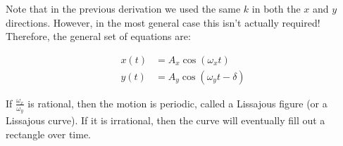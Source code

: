 Note that in the previous derivation we used the same $k$ in both the $x$ and $y$ directions. However, in the most general case this isn't actually required! Therefore, the general set of equations are: 

\begin{align*}
    x(t) &= A_x \cos (\omega_x t)\\
    y(t) &= A_y \cos(\omega_y t - \delta)
\end{align*}

If $\frac{\omega_x}{\omega_y}$ is rational, then the motion is periodic, called a Lissajous figure (or a Lissajous curve). If it is irrational, then the curve will eventually fill out a rectangle over time.